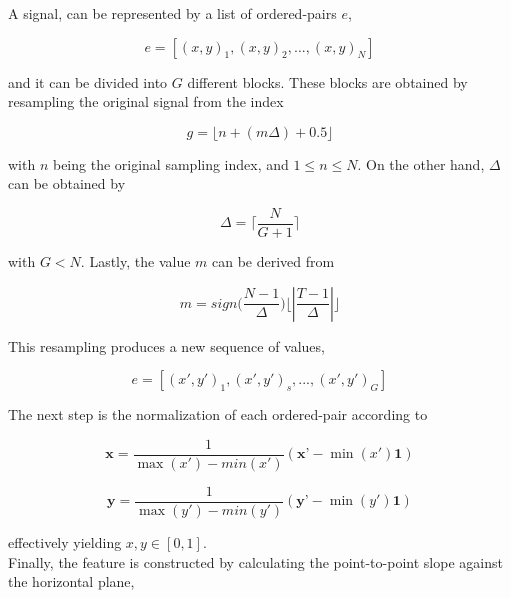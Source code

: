 \documentclass[brainsci,article,submit,moreauthors,pdftex,10pt,a4paper]{mdpi}
\begin{document}
A signal, can be represented by a list of ordered-pairs $e$,

\begin{equation}
e = \left[ (x,y)_{1}, (x,y)_{2}, ..., (x,y)_{N} \right]
\label{eq:shccdelta}
\end{equation}

\noindent and it can be divided into $G$ different blocks.  These blocks are obtained by resampling the original signal from the index 

\begin{equation}
g = \lfloor n + ( m \Delta ) + 0.5 \rfloor
\label{eq:shccdelta}
\end{equation}

\noindent with $n$ being the original sampling index, and $ 1 \leq n \leq N $.  On the other hand, $\Delta$ can be obtained by

\begin{equation}
\Delta = \bigg \lceil \frac{N}{G+1} \bigg \rceil
\label{eq:shccdelta}
\end{equation}

\noindent with $ G < N $. Lastly, the value $m$ can be derived from

\begin{equation}
m = sign \bigg (  \frac{N-1}{\Delta} \bigg )  \bigg \lfloor \left\lvert \frac{T-1}{\Delta} \right\lvert \bigg \rfloor
\label{eq:shccdelta}
\end{equation}

This resampling produces a new sequence of values,

\begin{equation}
e = \left[ (x',y')_{1}, (x',y')_{s}, ..., (x',y')_{G} \right]
\label{eq:shccdelta}
\end{equation}

The next step is the normalization of each ordered-pair according to

\begin{equation}
\textbf{x} = \frac{1}{\max(x') - min(x')} ( \textbf{x'} - \min(x') \textbf{1} )
\label{eq:shccdelta}
\end{equation}

\begin{equation}
\textbf{y} = \frac{1}{\max(y') - min(y')} ( \textbf{y'} - \min(y') \textbf{1} )
\label{eq:shccdelta}
\end{equation}

\noindent effectively yielding $x,y \in [0,1]$. \\

Finally, the feature is constructed by calculating the point-to-point slope against the horizontal plane,
\end{document}
